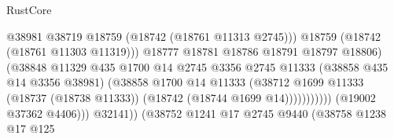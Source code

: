 \begin{lexlean}{RustCore}
\begin{coremodule}
                                                            @38981
                                                            @38719
                                                            @18759
                                                            (@18742 (@18761 @11313 @2745)))
                                                          @18759
                                                          (@18742 (@18761 @11303 @11319)))
                                                        @18777
                                                        @18781
                                                        @18786
                                                        @18791
                                                        @18797
                                                        @18806)
                                                      (@38848
                                                        @11329
                                                        @435
                                                        @1700
                                                        @14
                                                        @2745
                                                        @3356
                                                        @2745
                                                        @11333
                                                        (@38858 @435 @14 @3356 @38981)
                                                        (@38858
                                                          @1700
                                                          @14
                                                          @11333
                                                          (@38712
                                                            @1699
                                                            @11333
                                                            (@18737 (@18738 @11333))
                                                            (@18742 (@18744 @1699 @14)))))))))))
                                          (@19002 @37362 @4406)))
                                      @32141))
                                  (@38752
                                    @1241
                                    @17
                                    @2745
                                    @9440
                                    (@38758
                                      @1238
                                      @17
                                      @125

\end{coremodule}
\end{lexlean}
